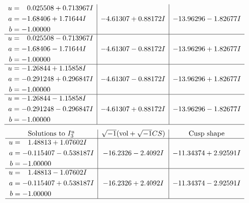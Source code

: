 \documentclass[1p]{elsarticle_modified}
\theoremstyle{definition}
\newcommand{\I}{\sqrt{-1}}
\begin{document}
$$\begin{array}{c|c|c}
\begin{aligned}
u &= \phantom{-}0.025508 + 0.713967 I \\
a &= -1.68406 + 1.71644 I \\
b &= -1.00000\phantom{ +0.000000I}\end{aligned}
 & -4.61307 + 0.88172 I & -13.96296 - 1.82677 I \\ \hline\begin{aligned}
u &= \phantom{-}0.025508 - 0.713967 I \\
a &= -1.68406 - 1.71644 I \\
b &= -1.00000\phantom{ +0.000000I}\end{aligned}
 & -4.61307 - 0.88172 I & -13.96296 + 1.82677 I \\ \hline\begin{aligned}
u &= -1.26844 + 1.15858 I \\
a &= -0.291248 + 0.296847 I \\
b &= -1.00000\phantom{ +0.000000I}\end{aligned}
 & -4.61307 - 0.88172 I & -13.96296 + 1.82677 I \\ \hline\begin{aligned}
u &= -1.26844 - 1.15858 I \\
a &= -0.291248 - 0.296847 I \\
b &= -1.00000\phantom{ +0.000000I}\end{aligned}
 & -4.61307 + 0.88172 I & -13.96296 - 1.82677 I\\
 \hline 
 \end{array}$$\newpage$$\begin{array}{c|c|c}  
\text{Solutions to }I^u_{3}& \I (\text{vol} + \sqrt{-1}CS) & \text{Cusp shape}\\
 \hline 
\begin{aligned}
u &= \phantom{-}1.48813 + 1.07602 I \\
a &= -0.115407 - 0.538187 I \\
b &= -1.00000\phantom{ +0.000000I}\end{aligned}
 & -16.2326 - 2.4092 I & -11.34374 + 2.92591 I \\ \hline\begin{aligned}
u &= \phantom{-}1.48813 - 1.07602 I \\
a &= -0.115407 + 0.538187 I \\
b &= -1.00000\phantom{ +0.000000I}\end{aligned}
 & -16.2326 + 2.4092 I & -11.34374 - 2.92591 I\\
 \hline 
 \end{array}$$\newpage\newpage\renewcommand{\arraystretch}{1}
\end{document}
